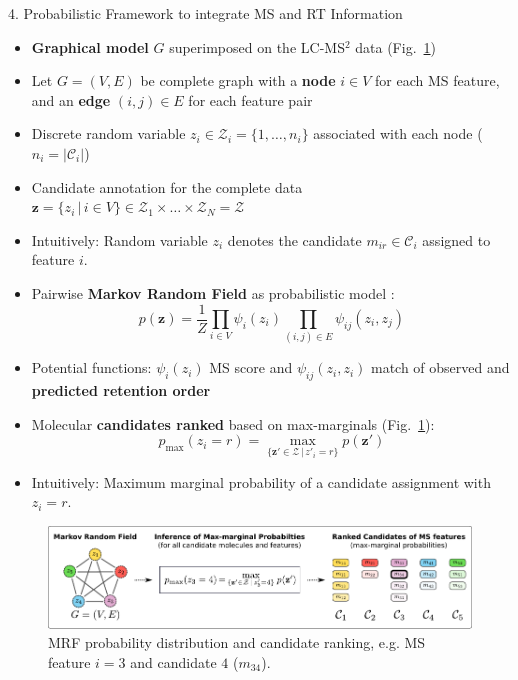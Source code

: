 \documentclass{beamer}
\newcommand{\ms}{MS}
\newcommand{\lc}{LC}
\newcommand{\msms}{\ms$^2$}
\newcommand{\lcmsms}{\lc-\msms}
\newcommand{\cands}{\mathcal{C}}
\newcommand{\seqlength}{N}
\begin{document}
\begin{frame}{}
\begin{columns}[T]
\hfill
{}
    \begin{block}{{\normalsize 4. Probabilistic Framework to integrate \ms{} and RT Information}}
    \begin{itemize}
        \item \textbf{Graphical model} $G$ superimposed on the \lcmsms{} data (Fig.~\ref{fig:mrf_and_ranking})
        \item Let $G=(V,E)$ be complete graph with a \textbf{node} $i\in V$ for each \ms{} feature, and an \textbf{edge} $(i,j)\in E$ for each feature pair 
        \item Discrete random variable $z_i\in\mathcal{Z}_i=\{1,\ldots,n_i\}$ associated with each node ($n_i=|\cands_i|$)
        \item Candidate annotation for the complete data $\mathbf{z}=\{z_i\,|\,i\in V\}\in\mathcal{Z}_1\times\ldots\times\mathcal{Z}_\seqlength=\mathcal{Z}$
        \item Intuitively: Random variable $z_i$ denotes the candidate $m_{ir}\in\mathcal{C}_i$ assigned to feature $i$.
        \item Pairwise \textbf{Markov Random Field} as probabilistic model \cite{MacKay2005}:
            \begin{equation}
                p(\mathbf{z})=\frac{1}{Z}\prod_{i\in V}\psi_i(z_i)\prod_{(i,j)\in E}\psi_{ij}(z_i,z_j)
                \label{eq:mrf}
            \end{equation} 
        \item Potential functions: $\psi_i(z_i)$ \ms{} score and $\psi_{ij}(z_i,z_i)$ match of observed and \textbf{predicted retention order}
        \item Molecular \textbf{candidates ranked} based on max-marginals \cite{MacKay2005} (Fig.~\ref{fig:mrf_and_ranking}):
            \begin{equation}
                p_{\max}(z_i=r)=\underset{\{\mathbf{z}'\in\mathcal{Z}\,|\,z'_i=r\}}{\max}p(\mathbf{z}')
            \end{equation}
        \item Intuitively: Maximum marginal probability of a candidate assignment with $z_i=r$.
    \end{itemize}
    \vspace{0.25cm}
    \begin{figure}
        \centering
        \includegraphics[width=\textwidth]{images/mrf_and_ranking.pdf}
        \caption{MRF probability distribution and candidate ranking, e.g. \ms{} feature $i=3$ and candidate $4$ ($m_{34}$).}
        \label{fig:mrf_and_ranking}
    \end{figure}
    \end{block}


\end{columns}
\end{frame}
\end{document}
